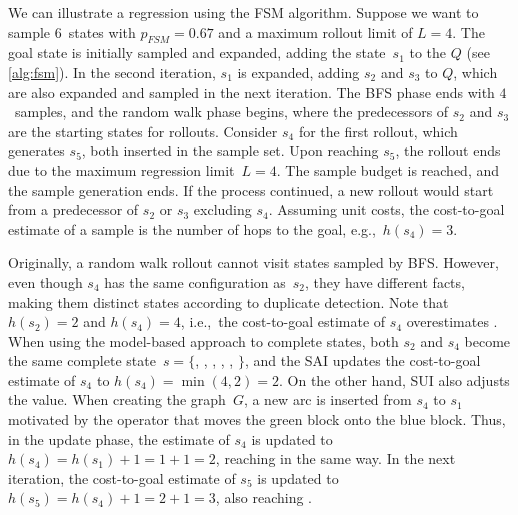 We can illustrate a regression using the FSM algorithm. Suppose we want to sample $6$~states with $p_{FSM}=0.67$ and a maximum rollout limit of $L=4$. The goal state is initially sampled and expanded, adding the state~$s_1$ to the $Q$ (see \cref{alg:fsm}). In the second iteration, $s_1$ is expanded, adding $s_2$ and $s_3$ to $Q$, which are also expanded and sampled in the next iteration. The BFS phase ends with $4$~samples, and the random walk phase begins, where the predecessors of $s_2$ and $s_3$ are the starting states for rollouts. Consider $s_4$ for the first rollout, which generates $s_5$, both inserted in the sample set. Upon reaching $s_5$, the rollout ends due to the maximum regression limit~$L = 4$. The sample budget is reached, and the sample generation ends. If the process continued, a new rollout would start from a predecessor of $s_2$ or $s_3$ excluding $s_4$. Assuming unit costs, the cost-to-goal estimate of a sample is the number of hops to the goal, e.g.,~$h(s_4)=3$.

Originally, a random walk rollout cannot visit states sampled by BFS. However, even though $s_4$ has the same configuration as~$s_2$, they have different facts, making them distinct states according to duplicate detection. Note that $h(s_2)=2$ and $h(s_4)=4$, i.e.,~the cost-to-goal estimate of $s_4$ overestimates \hstar. When using the model-based approach to complete states, both $s_2$ and $s_4$ become the same complete state~$s = \{$\mbox{}, \mbox{}, \mbox{}, \mbox{}, \mbox{}, \mbox{}$\}$, and the SAI updates the cost-to-goal estimate of $s_4$ to $h(s_4)=\min(4,2)=2$. On the other hand, SUI also adjusts the value. When creating the graph~$G$, a new arc is inserted from $s_4$ to $s_1$ motivated by the operator that moves the green block onto the blue block. Thus, in the update phase, the estimate of $s_4$ is updated to $h(s_4)=h(s_1)+1=1+1=2$, reaching \hstar in the same way. In the next iteration, the cost-to-goal estimate of $s_5$ is updated to $h(s_5)=h(s_4)+1=2+1=3$, also reaching \hstar.
